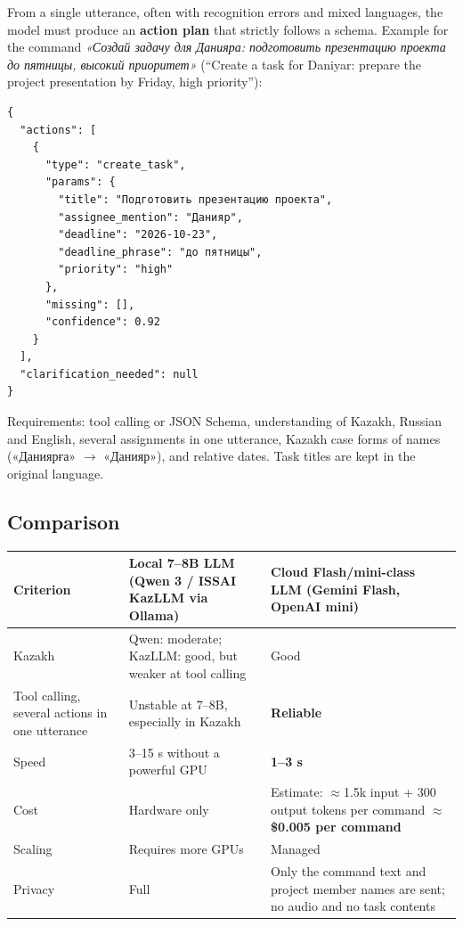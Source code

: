 \documentclass[11pt,a4paper]{article}
\newcommand{\tblstart}{\small\rowcolors{2}{gray!7}{white}}
\begin{document}
From a single utterance, often with recognition errors and mixed languages, the model must produce an \textbf{action plan} that strictly follows a schema. Example for the command \textit{«Создай задачу для Данияра: подготовить презентацию проекта до пятницы, высокий приоритет»} (“Create a task for Daniyar: prepare the project presentation by Friday, high priority”):

\begin{Verbatim}[fontsize=\small,frame=single,framesep=6pt,rulecolor=\color{gray!50}]
{
  "actions": [
    {
      "type": "create_task",
      "params": {
        "title": "Подготовить презентацию проекта",
        "assignee_mention": "Данияр",
        "deadline": "2026-10-23",
        "deadline_phrase": "до пятницы",
        "priority": "high"
      },
      "missing": [],
      "confidence": 0.92
    }
  ],
  "clarification_needed": null
}
\end{Verbatim}

Requirements: tool calling or JSON Schema, understanding of Kazakh, Russian and English, several assignments in one utterance, Kazakh case forms of names («Даниярға» $\rightarrow$ «Данияр»), and relative dates. Task titles are kept in the original language.

\subsection{Comparison}

{\tblstart
\begin{xltabular}{\textwidth}{P{3.2cm} L L}
\toprule
\textbf{Criterion} & \textbf{Local 7--8B LLM (Qwen 3 / ISSAI KazLLM via Ollama)} & \textbf{Cloud Flash/mini-class LLM (Gemini Flash, OpenAI mini)} \\
\midrule
\endhead
Kazakh & Qwen: moderate; KazLLM: good, but weaker at tool calling & Good \\
Tool calling, several actions in one utterance & Unstable at 7--8B, especially in Kazakh & \textbf{Reliable} \\
Speed & 3--15 s without a powerful GPU & \textbf{1--3 s} \\
Cost & Hardware only & Estimate: $\approx$1.5k input + 300 output tokens per command $\approx$ \textbf{\$0.005 per command} \\
Scaling & Requires more GPUs & Managed \\
Privacy & Full & Only the command text and project member names are sent; no audio and no task contents \\
\bottomrule
\end{xltabular}}
\end{document}
